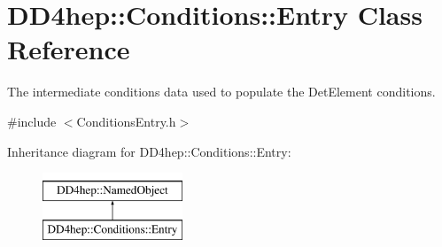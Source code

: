 \hypertarget{class_d_d4hep_1_1_conditions_1_1_entry}{}\section{D\+D4hep\+:\+:Conditions\+:\+:Entry Class Reference}
\label{class_d_d4hep_1_1_conditions_1_1_entry}


The intermediate conditions data used to populate the Det\+Element conditions.  




{\ttfamily \#include $<$Conditions\+Entry.\+h$>$}

Inheritance diagram for D\+D4hep\+:\+:Conditions\+:\+:Entry\+:\begin{figure}[H]
\begin{center}
\leavevmode
\includegraphics[height=2.000000cm]{class_d_d4hep_1_1_conditions_1_1_entry}
\end{center}
\end{figure}
